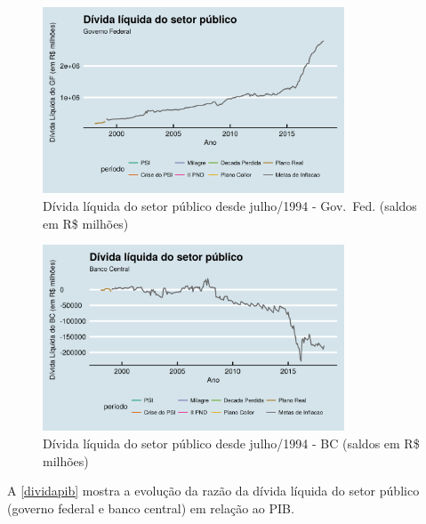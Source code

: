 \documentclass[
	10pt,				%
	openright,			%
	twoside,			%
	a5paper,			%
	english,			%
	french,				%
	spanish,			%
	brazil				%
	]{abntex2}
\begin{document}
\begin{figure}[htbp]
\caption{Dívida líquida do setor público desde julho/1994 - Gov.~Fed. (saldos em R\$ milhões)}\label{divida_liquida_GF}
\begin{center}
\includegraphics[width=0.80000\textwidth]{imagens/divida_liquida_GF-1.png}
\end{center}
\end{figure}

\begin{figure}[htbp]
\caption{Dívida líquida do setor público desde julho/1994 - BC (saldos em R\$ milhões)}\label{divida_liquida_BC}
\begin{center}
\includegraphics[width=0.80000\textwidth]{imagens/divida_liquida_BC-1.png}
\end{center}
\end{figure}

A \autoref{dividapib} mostra a evolução da razão da dívida líquida do
setor público (governo federal e banco central) em relação ao PIB.
\end{document}
